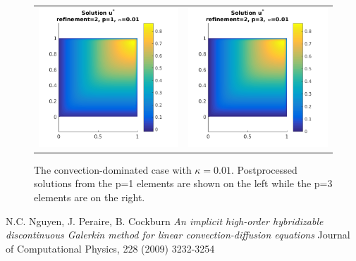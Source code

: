 \documentclass{article}
\begin{document}
\begin{figure}[!ht]
\begin{tabular}{c c}
\includegraphics[scale=0.7]{umustar_133.png} &
\includegraphics[scale=0.7]{umustar_233.png}
\end{tabular}
\caption{The convection-dominated case with $\kappa = 0.01$. Postprocessed solutions from the p=1 elements are shown on the left while the p=3 elements are on the right.}
\label{fig:ustar1}
\end{figure}
\begin{thebibliography}{9}
N.C. Nguyen, J. Peraire, B. Cockburn
\textit{An implicit high-order hybridizable discontinuous Galerkin method for linear convection-diffusion equations}
Journal of Computational Physics, 228 (2009) 3232-3254
\end{thebibliography}
\end{document}
